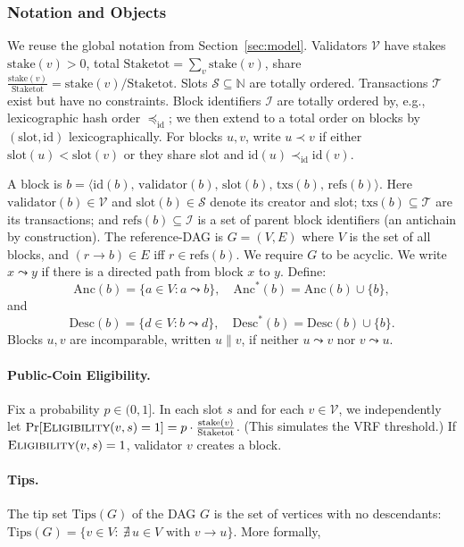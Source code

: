\documentclass[11pt]{article}
\newcommand{\Val}{\ensuremath{\mathcal{V}}\xspace}
\newcommand{\Slot}{\ensuremath{\mathcal{S}}\xspace}
\newcommand{\Tx}{\ensuremath{\mathcal{T}}\xspace}
\newcommand{\Id}{\ensuremath{\mathcal{I}}\xspace}
\newcommand{\stake}{\ensuremath{\mathrm{stake}}\xspace}
\newcommand{\StakeTot}{\ensuremath{\mathrm{Stake}{\mathrm{tot}}}\xspace}
\newcommand{\stakefrac}[1]{\ensuremath{\frac{\stake(#1)}{\StakeTot}}\xspace}
\newcommand{\id}{\ensuremath{\mathrm{id}}\xspace}
\newcommand{\val}{\ensuremath{\mathrm{validator}}\xspace}
\newcommand{\slot}{\ensuremath{\mathrm{slot}}\xspace}
\newcommand{\txs}{\ensuremath{\mathrm{txs}}\xspace}
\newcommand{\refs}{\ensuremath{\mathrm{refs}}\xspace}
\newcommand{\Anc}{\ensuremath{\mathrm{Anc}}\xspace}
\newcommand{\Desc}{\ensuremath{\mathrm{Desc}}\xspace}
\newcommand{\Tips}{\ensuremath{\mathrm{Tips}}\xspace}
\newcommand{\Eligibility}{\ensuremath{\textsc{Eligibility}}\xspace}
\begin{document}
\subsubsection{Notation and Objects}
\label{subsec:ideal-notation}
We reuse the global notation from Section~\ref{sec:model}. Validators $\Val$ have stakes $\stake(v)>0$, total $\StakeTot=\sum_{v}\stake(v)$, share $\stakefrac{v} = \stake(v)/\StakeTot$. Slots $\Slot\subseteq\mathbb{N}$ are totally ordered. Transactions $\Tx$ exist but have no constraints. Block identifiers $\Id$ are totally ordered by, e.g., lexicographic hash order $\preceq_{\mathrm{id}}$; we then extend to a total order on blocks by $(\slot,\id)$ lexicographically. For blocks $u,v$, write $u \prec v$ if either $\slot(u)<\slot(v)$ or they share slot and $\id(u)\prec_{\mathrm{id}}\id(v)$.

A block is $b=\langle \id(b),\,\val(b),\,\slot(b),\,\txs(b),\,\refs(b)\rangle$. Here $\val(b)\in\Val$ and $\slot(b)\in\Slot$ denote its creator and slot; $\txs(b)\subseteq\Tx$ are its transactions; and $\refs(b)\subseteq\Id$ is a set of parent block identifiers (an antichain by construction). The reference-DAG is $G=(V,E)$ where $V$ is the set of all blocks, and $(r\to b)\in E$ iff $r\in \refs(b)$. We require $G$ to be acyclic. We write $x\leadsto y$ if there is a directed path from block $x$ to $y$. Define:
\begin{equation*}
\Anc(b)=\{a\in V: a\leadsto b\},\quad \Anc^*(b)=\Anc(b)\cup\{b\},
\end{equation*}
and
\begin{equation*}
\Desc(b)=\{d\in V: b\leadsto d\},\quad \Desc^*(b)=\Desc(b)\cup\{b\}.
\end{equation*}
Blocks $u,v$ are incomparable, written $u\parallel v$, if neither $u\leadsto v$ nor $v\leadsto u$.

\paragraph{Public-Coin Eligibility.} Fix a probability $p\in(0,1]$. In each slot $s$ and for each $v\in\Val$, we independently let $\Pr[\Eligibility(v,s)=1] = p\cdot \stakefrac{v}$. (This simulates the VRF threshold.) If $\Eligibility(v,s)=1$, validator $v$ creates a block.

\paragraph{Tips.} The tip set $\Tips(G)$ of the DAG $G$ is the set of vertices with no descendants: $\Tips(G)=\{v\in V:\ \nexists\,u\in V \text{ with } v\to u\}$. More formally,
\end{document}
